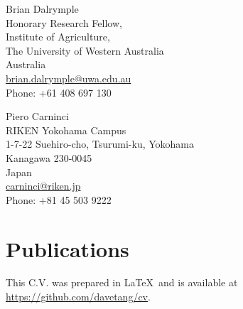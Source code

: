 \documentclass[a4paper, 10pt]{article}
\begin{document}
\begin{minipage}[ht]{.50\textwidth}
Brian Dalrymple \\
Honorary Research Fellow, \\
Institute of Agriculture, \\
The University of Western Australia \\
Australia \\
\href{mailto:brian.dalrymple@uwa.edu.au}{brian.dalrymple@uwa.edu.au} \\
Phone: +61 408 697 130
\end{minipage}
\begin{minipage}[ht]{.50\textwidth}
Piero Carninci \\
RIKEN Yokohama Campus \\
1-7-22 Suehiro-cho, Tsurumi-ku, Yokohama \\
Kanagawa 230-0045 \\
Japan \\
\href{mailto:carninci@riken.jp}{carninci@riken.jp} \\
Phone: +81 45 503 9222
\end{minipage}

\section*{Publications}
\begingroup
   \renewcommand{\section}[2]{}
   
   \nocite{*}
   
\endgroup

\vfill

\footnotesize
This C.V. was prepared in \LaTeX\ and is available at \href{https://github.com/davetang/cv}{https://github.com/davetang/cv}.
\end{document}
